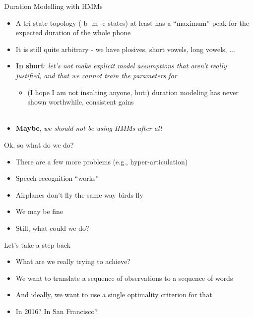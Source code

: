 \begin{frame}{Duration Modelling with HMMs}
  \begin{itemize}
  \item A tri-state topology (-b -m -e states) at least has a ``maximum'' peak for
    the expected duration of the whole phone
  \item It is still quite arbitrary - we have plosives, short vowels, long vowels, ...\\
    \hspace{1cm}
  \item \textbf{In short}: \textit{let's not make explicit model assumptions
    that aren't really justified, and that we cannot train the parameters for}
    \begin{itemize}
    \item (I hope I am not insulting anyone, but:) duration modeling has never shown
      worthwhile, consistent gains\\
      \hspace{1cm}\\
      \hspace{1cm}
    \end{itemize}
    \item \textbf{Maybe}, \textit{we should not be using HMMs after all}
  \end{itemize}
\end{frame}

\begin{frame}{Ok, so what do we do?}
  \begin{itemize}
  \item There are a few more problems (e.g., hyper-articulation)
  \item Speech recognition ``works''
  \item Airplanes don't fly the same way birds fly
  \item We may be fine
  \item Still, what could we do?
  \end{itemize}
\end{frame}

\begin{frame}{Let's take a step back}
  \begin{itemize}
  \item What are we really trying to achieve?
  \item We want to translate a sequence of observations to a sequence of words
  \item And ideally, we want to use a single optimality criterion for that
  \item In 2016? In San Francisco?
  \end{itemize}
\end{frame}

